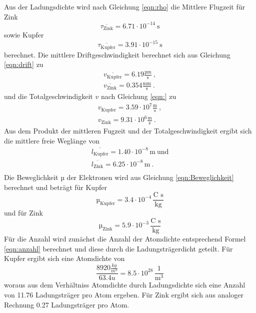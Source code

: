 Aus der Ladungsdichte wird nach Gleichung \ref{eqn:rho} die Mittlere Flugzeit für Zink
\begin{equation}
  \overline{\tau_\text{Zink}} = 6.71 \cdot 10^{-14} \ \text{s}
  \label{eqn:tZ}
\end{equation}
sowie Kupfer
\begin{equation}
  \overline{\tau_\text{Kupfer}} = 3.91 \cdot 10^{-15} \ \text{s}
    \label{eqn:tK}
\end{equation}
berechnet. Die mittlere Driftgeschwindigkeit berechnet sich aus Gleichung \ref{eqn:drift} zu
\begin{eqnarray}
  \overline{v_\text{Kupfer}} = 6.19 \frac{\text{µm}}{\text{s}} \ , \\
  \overline{v_\text{Zink}} = 0.354 \frac{\text{mm}}{\text{s}} \ .
\end{eqnarray}
und die Totalgeschwindigkeit $v$ nach Gleichung \ref{eqn:} zu
\begin{eqnarray}
  v_\text{Kupfer} = 3.59 \cdot 10^7 \frac{\text{m}}{\text{s}} \ , \\
  v_\text{Zink} = 9.31 \cdot 10^6 \frac{\text{m}}{\text{s}} \ .
\end{eqnarray}
Aus dem Produkt der mittleren Fugzeit und der Totalgeschwindigkeit ergibt sich die mittlere freie Weglänge von
\begin{eqnarray}
  \overline{l_\text{Kupfer}} = 1.40 \cdot 10^{-8} \, \text{m} \ \text{und} \\
  \overline{l_\text{Zink}} = 6.25 \cdot 10^{-8} \, \text{m} \ .\\
\end{eqnarray}
Die Beweglichkeit $µ$ der Elektronen wird aus Gleichung \ref{eqn:Beweglichkeit} berechnet und beträgt für Kupfer
\begin{equation}
  µ_\text{Kupfer} = 3.4 \cdot 10^{-4} \, \frac{\text{C s}}{\text{kg}}
\end{equation}
und für Zink
\begin{equation}
  µ_\text{Zink} = 5.9 \cdot 10^{-3} \, \frac{\text{C s}}{\text{kg}}
\end{equation}
Für die Anzahl wird zunächst die Anzahl der Atomdichte entsprechend Formel \ref{eqn:anzahl} berechnet und diese durch die Ladungsträgerdicht geteilt. Für Kupfer ergibt sich eine Atomdichte von
\begin{equation}
  \frac{8920 \frac{kg}{m^3}}{63.4 u} = 8.5 \cdot 10^{28} \, \frac{1}{\text{m}^3}
\end{equation}
woraus aus dem Verhältniss Atomdichte durch Ladungsdichte sich eine Anzahl von 11.76 Ladungsträger pro Atom ergeben. Für Zink ergibt sich aus analoger Rechnung 0.27 Ladungsträger pro Atom.

